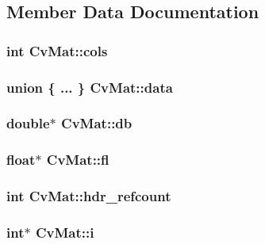 \subsection{Member Data Documentation}
\hypertarget{structCvMat_ad3706bc15c75d94d1a938172b2f790b5}{
\subsubsection[{cols}]{\setlength{\rightskip}{0pt plus 5cm}int Cv\-Mat\-::cols}}\label{structCvMat_ad3706bc15c75d94d1a938172b2f790b5}
\hypertarget{structCvMat_af4a5c6f05447bd400a4e1246ffe685af}{
\subsubsection[{data}]{\setlength{\rightskip}{0pt plus 5cm}union \{ ... \}   Cv\-Mat\-::data}}\label{structCvMat_af4a5c6f05447bd400a4e1246ffe685af}
\hypertarget{structCvMat_a7ed7f844011cc42ca5b338ae3cf4eb83}{
\subsubsection[{db}]{\setlength{\rightskip}{0pt plus 5cm}double$\ast$ Cv\-Mat\-::db}}\label{structCvMat_a7ed7f844011cc42ca5b338ae3cf4eb83}
\hypertarget{structCvMat_a7015f3f7b174d073303fe96359ec5a5a}{
\subsubsection[{fl}]{\setlength{\rightskip}{0pt plus 5cm}float$\ast$ Cv\-Mat\-::fl}}\label{structCvMat_a7015f3f7b174d073303fe96359ec5a5a}
\hypertarget{structCvMat_a1f984bbb5329fbfd7b8230ca2f63e62e}{
\subsubsection[{hdr\-\_\-refcount}]{\setlength{\rightskip}{0pt plus 5cm}int Cv\-Mat\-::hdr\-\_\-refcount}}\label{structCvMat_a1f984bbb5329fbfd7b8230ca2f63e62e}
\hypertarget{structCvMat_acdf5cf8c58ab40a5602235d954440563}{
\subsubsection[{i}]{\setlength{\rightskip}{0pt plus 5cm}int$\ast$ Cv\-Mat\-::i}}\label{structCvMat_acdf5cf8c58ab40a5602235d954440563}
